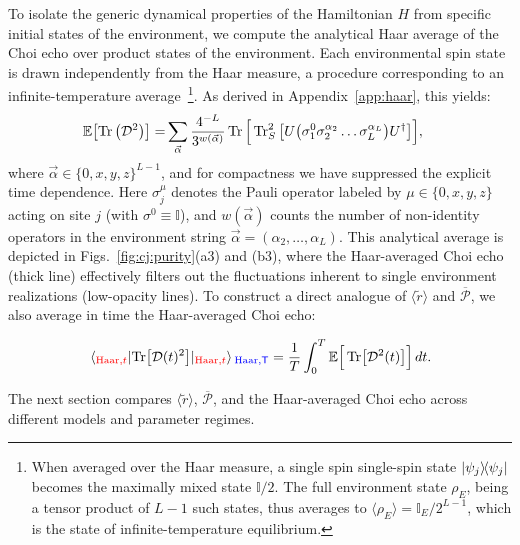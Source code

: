 \documentclass[pra,twocolumn,aps,showpacs,superscriptaddress,longbibliography]{revtex4-2}%
\providecommand{\DIFadd}[1]{{\protect\color{blue} \sf #1}} %
\providecommand{\DIFdel}[1]{{\protect\color{red} \scriptsize #1}} %
\providecommand{\DIFaddbegin}{} %
\providecommand{\DIFaddend}{} %
\providecommand{\DIFdelbegin}{} %
\providecommand{\DIFdelend}{} %
\begin{document}
To isolate the generic dynamical properties of the Hamiltonian $H$ from specific initial states of the environment, we compute the analytical Haar average of the Choi echo over product states of the environment. Each environmental spin state is drawn independently from the Haar measure, a procedure corresponding to an infinite-temperature average~\footnote{When averaged over the Haar measure, a \DIFdelbegin \DIFdel{single spin }\DIFdelend \DIFaddbegin \DIFadd{single-spin }\DIFaddend state $\dyad{\psi_j}$ becomes the maximally mixed state $\mathbb{I}/2$. The full environment state $\rho_E$, being a tensor product of $L-1$ such states, thus averages to $\langle \rho_E \rangle = \mathbb{I}_E / 2^{L-1}$, which is the state of infinite-temperature equilibrium.}. As derived in Appendix~\ref{app:haar}, this yields:
\begin{align}\label{eq:haar:avg:choi}
\mathbb{E}\bqty{\Tr\pqty{\mathcal{D}^{2}}} =& 
\sum_{\vec{\alpha} }
  \frac{4^{-L}}{3^{w(\vec{\alpha})}}
\Tr \Big[ \Tr_S^2 \big[U
\qty(\sigma_1^0 \sigma_2^{\alpha_2} \ldots \sigma_L^{\alpha_L})
U^\dagger \big] \Big],
\end{align}
where $\vec{\alpha} \in \{0,x,y,z\}^{L-1}$, and for compactness we have  suppressed the explicit time dependence. Here $\sigma_j^\mu$ denotes the Pauli 
operator labeled by $\mu \in \{0,x,y,z\}$ acting on site $j$ (with $\sigma^0 \equiv \mathbb{I}$), 
and $w(\vec{\alpha})$ counts the number of non-identity operators in the 
environment string $\vec{\alpha} = (\alpha_2, \dots, \alpha_L)$. This analytical average is depicted in Figs.~\ref{fig:cj:purity}(a3) and (b3), where the Haar-averaged Choi echo (thick line) effectively filters out the fluctuations inherent to single environment realizations (low-opacity lines). To construct a direct analogue of $\langle \tilde{r} \rangle$ and $\overline{\mathcal{P}}$, we also average in time the Haar-averaged Choi echo:
\DIFaddbegin 

\DIFaddend \begin{equation}\label{eq:avg:CJ}
\expval{\Tr[\mcD(t)^2]}\DIFdelbegin \DIFdel{_{\text{Haar}, t} }\DIFdelend \DIFaddbegin \DIFadd{_{\text{Haar}, T} }\DIFaddend = \frac{1}{T}
\int_{0}^{T} \mathbb{E}\Big[\Tr[\mathcal{D}^{2}(t)]\Big] \, dt.
\end{equation}
\DIFaddbegin 

\DIFaddend The next section compares $\langle \tilde{r} \rangle$, $\overline{\mathcal{P}}$, and the Haar-averaged Choi echo across different models and parameter regimes.
\DIFaddbegin 
\end{document}
